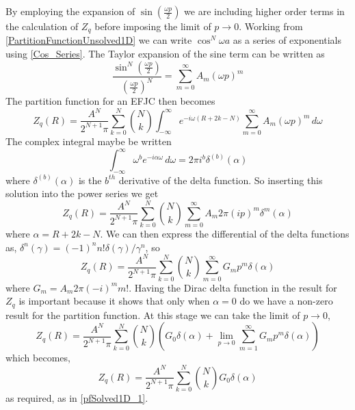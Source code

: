 By employing the expansion of $\sin(\frac{\omega p}{2})$ we are including higher order terms in the calculation of $Z_{q}$ before imposing the limit of $p\rightarrow0$. Working from \eqref{PartitionFunctionUnsolved1D} we can write $\cos^{N} \omega a$ as a series of exponentials using \eqref{Cos_Series}. The Taylor expansion of the sine term can be written as
%
\begin{equation}\label{sin_taylor}
\frac{ \sin^{N} \left(\frac{\omega p}{2}\right)}{\left(\frac{\omega p}{2}\right)^{N}} =  \sum_{m=0}^{\infty}A_{m}\left(\omega p \right)^{m}
\end{equation}
%
The partition function for an EFJC then becomes
%
\begin{equation}
Z_{q}\left(R\right)=\frac{A^{N}}{2^{N+1}\pi}\sum_{k=0}^{N}\binom{N}{k}\int_{-\infty}^{\infty}e^{-i\omega\left(R+2k-N\right)}\sum_{m=0}^{\infty}A_{m}\left(\omega p\right)^{m}\, d\omega
\end{equation}
%
The complex integral maybe be written \cite{Bronshtein2007}
%
\begin{equation}
\int_{-\infty}^{\infty}\omega^{b}e^{-i\alpha\omega}\, d\omega=2\pi i^{b}\delta^{(b)}(\alpha)
\end{equation}
%
where $\delta^{(b)}(\alpha)$ is the $b^{th}$ derivative of the delta function. So inserting this solution into the power series we get
%
\begin{equation}
Z_{q}\left(R\right)=\frac{A^{N}}{2^{N+1}\pi}\sum_{k=0}^{N}\binom{N}{k} \sum^{\infty}_{m=0}A_{m}2\pi (ip)^{m}\delta^{m}\left(\alpha\right)
\end{equation}
%
where $\alpha=R+2k-N$. We can then express the differential of the delta functions as,
$\delta^{n}\left(\gamma\right)=\left(-1\right)^{n}n!\delta\left(\gamma\right)/\gamma^{n}$, so
%
\begin{equation}
Z_{q}\left(R\right)=\frac{A^{N}}{2^{N+1}\pi}\sum_{k=0}^{N}\binom{N}{k} \sum^{\infty}_{m=0}G_{m}p^{m}\delta\left(\alpha\right)
\end{equation}
%
where $G_{m} = A_{m}2\pi \left(-i\right)^{m} m!$. Having the Dirac delta function in the result for $Z_{q}$ is important because it shows that only when $\alpha=0$ do we have a non-zero result for the partition function. At this stage we can take the limit of $p\rightarrow0$,
%
\begin{equation}
Z_{q}\left(R\right)=\frac{A^{N}}{2^{N+1}\pi}\sum_{k=0}^{N}\binom{N}{k}\left(G_{0}\delta\left(\alpha\right) + \lim_{p \to 0}\sum^{\infty}_{m=1}G_{m}p^{m}\delta\left(\alpha\right) \right)
\end{equation}
%
which becomes,
%
\begin{equation}
Z_{q}\left(R\right)=\frac{A^{N}}{2^{N+1}\pi}\sum_{k=0}^{N}\binom{N}{k}G_{0}\delta\left(\alpha\right)\label{pfSolved1D_2}
\end{equation}
%
as required, as in \eqref{pfSolved1D_1}. 

